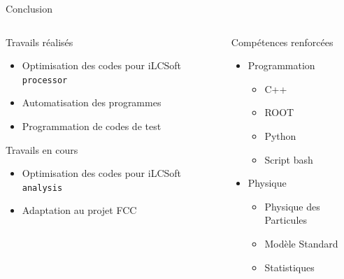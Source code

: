 \documentclass[9pt]{beamer}
\begin{document}
\begin{frame}{Conclusion}

\begin{columns}

	\begin{column}{0.45\textwidth}
		\begin{exampleblock}{Travails réalisés}
			\begin{itemize}
		 		\item Optimisation des codes pour iLCSoft \texttt{processor}
		 		\item Automatisation des programmes
		 		\item Programmation de codes de test
			\end{itemize}
		\end{exampleblock}
        \begin{alertblock}{Travails en cours}
			\begin{itemize}
		 		\item Optimisation des codes pour iLCSoft \texttt{analysis}
		 		\item Adaptation au projet FCC
			\end{itemize}
		\end{alertblock}
	\end{column}
	
	\begin{column}{0.45\textwidth}
		\begin{block}{Compétences renforcées}
			\begin{itemize}
                \item Programmation
                \begin{itemize}
                    \item C++
                    \item ROOT
                    \item Python
                    \item Script bash
                \end{itemize}
                
                \item Physique
                \begin{itemize}
                    \item Physique des Particules
                    \item Modèle Standard
                    \item Statistiques
                \end{itemize}
            

\end{itemize}
\end{block}
\end{column}
\end{columns}
\end{frame}
\end{document}
